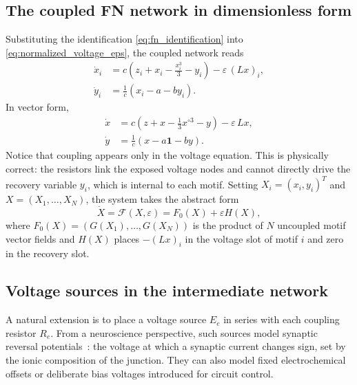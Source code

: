 \documentclass[11pt]{article}
\begin{document}
\subsection{The coupled FN network in dimensionless form}

Substituting the identification \eqref{eq:fn_identification} into
\eqref{eq:normalized_voltage_eps}, the coupled network reads
\begin{align}
  \dot{x}_i
  &=
  c\!\left(z_i + x_i - \frac{x_i^3}{3} - y_i\right)
  -
  \varepsilon\,(Lx)_i,
  \label{eq:coupled_x}\\
  \dot{y}_i
  &=
  \frac{1}{c}(x_i - a - by_i).
  \label{eq:coupled_y}
\end{align}
In vector form,
\begin{align}
  \dot{x}
  &=
  c\!\left(z + x - \tfrac{1}{3}x^{\circ 3} - y\right)
  -
  \varepsilon\,Lx,
  \label{eq:eps_x}\\
  \dot{y}
  &=
  \frac{1}{c}(x - a\mathbf{1} - by).
  \label{eq:eps_y}
\end{align}
Notice that coupling appears only in the voltage equation. This is
physically correct: the resistors link the exposed voltage nodes and
cannot directly drive the recovery variable $y_i$, which is internal
to each motif. Setting $X_i = (x_i, y_i)^T$ and $X =
(X_1,\ldots,X_N)$, the system takes the abstract form
\begin{equation}
  \dot X = \mathcal{F}(X,\varepsilon) = F_0(X) + \varepsilon H(X),
  \label{eq:abstract}
\end{equation}
where $F_0(X) = (G(X_1),\ldots,G(X_N))$ is the product of $N$
uncoupled motif vector fields and $H(X)$ places $-(Lx)_i$ in the
voltage slot of motif $i$ and zero in the recovery slot.

\subsection{Voltage sources in the intermediate network}
\label{sec:voltage_sources}

A natural extension is to place a voltage source $E_e$ in series with
each coupling resistor $R_e$. From a neuroscience perspective, such sources model
synaptic reversal potentials~\cite{dayan2001}: the voltage at which a
synaptic current changes sign, set by the ionic composition of the
junction. They can also model fixed electrochemical offsets or
deliberate bias voltages introduced for circuit control.
\end{document}
